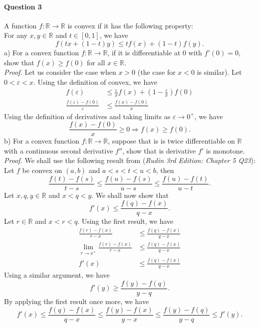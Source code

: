 \documentclass{article}
\begin{document}
\paragraph{Question 3} A function $f : \mathbb{R} \to \mathbb{R}$ is convex if it has the following property: \\
For any $x, y \in \mathbb{R}$ and $t \in [0, 1]$, we have
$$ f(tx + (1-t)y) \leq tf(x) + (1 - t)f(y). $$
a) For a convex function $f : \mathbb{R} \to \mathbb{R}$, if it is differentiable at 0 with $f'(0) = 0$, show that $f(x) \geq f(0)$ for all $x \in \mathbb{R}$. \\
\textit{Proof.} Let us consider the case when $x > 0$ (the case for $x < 0$ is similar). Let $0<\varepsilon<x$. Using the definition of convex, we have 
\begin{align*}
    f(\varepsilon) &\leq \frac{\varepsilon}{x}f(x) + \left(1-\frac{\varepsilon}{x}\right)f(0) \\
    \frac{f(\varepsilon) - f(0)}{\varepsilon} &\leq \frac{f(x) - f(0)}{x}
\end{align*}
Using the definition of derivatives and taking limits as $\varepsilon \to 0^+$, we have
$$ \frac{f(x) - f(0)}{x} \geq 0 \Rightarrow f(x) \geq f(0). $$
b) For a convex function $f : \mathbb{R} \to \mathbb{R}$, suppose that is is twice differentiable on $\mathbb{R}$ with a continuous second derivative $f''$, show that is derivative $f'$ is monotone. \\
\textit{Proof.} We shall use the following result from (\textit{Rudin 3rd Edition: Chapter 5 Q23}): \\
Let $f$ be convex on $(a, b)$ and $a < s < t < u < b$, then
$$ \frac{f(t) - f(s)}{t - s} \leq \frac{f(u) - f(s)}{u - s} \leq \frac{f(u) - f(t)}{u - t}. $$
Let $x, q, y \in \mathbb{R}$ and $x < q < y$. We shall now show that 
$$ f'(x) \leq \frac{f(q) - f(x)}{q - x}. $$
Let $r \in \mathbb{R}$ and $x < r < q$. Using the first result, we have 
\begin{align*}
    \frac{f(r) - f(x)}{r - x} &\leq \frac{f(q) - f(x)}{q - x} \\
    \lim_{r \to x^+} \frac{f(r) - f(x)}{r - x} &\leq \frac{f(q) - f(x)}{q - x} \\
    f'(x) &\leq \frac{f(q) - f(x)}{q - x}
\end{align*}
Using a similar argument, we have 
$$ f'(y) \geq \frac{f(y) - f(q)}{y - q}. $$
By applying the first result once more, we have
$$ f'(x) \leq \frac{f(q) - f(x)}{q - x} \leq \frac{f(y) - f(x)}{y - x} \leq \frac{f(y) - f(q)}{y - q} \leq f'(y). $$
\end{document}
